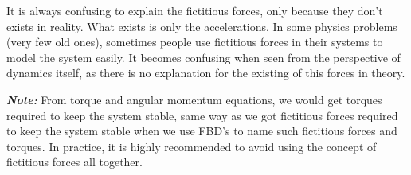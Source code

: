 It is always confusing to explain the fictitious forces, only because they don't exists in reality. What exists is only the accelerations. In some physics problems (very few old ones), sometimes people use fictitious forces in their systems to model the system easily. It becomes confusing when seen from the perspective of dynamics itself, as there is no explanation for the existing of this forces in theory.

\textbf{\textit{Note: }}From torque and angular momentum equations, we would get torques required to keep the system stable, same way as we got fictitious forces required to keep the system stable when we use FBD's to name such fictitious forces and torques. In practice, it is highly recommended to avoid using the concept of fictitious forces all together.










